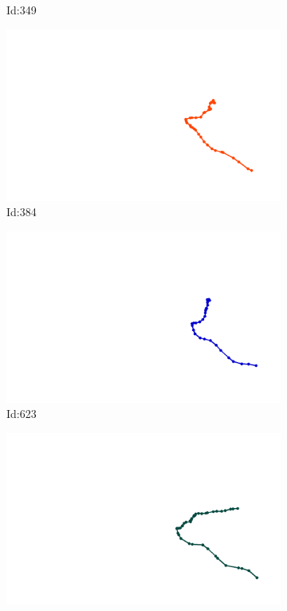 \documentclass[12pt,twoside]{report}
\begin{document}
\begin{figure}
\begin{subfigure}[b]{0.20\textwidth}
\caption{Id:349}
\end{subfigure}
\begin{subfigure}[b]{0.20\textwidth}
\centering
\includegraphics[width=\textwidth]{../../trajectories/384.png}
\caption{Id:384}
\end{subfigure}
\begin{subfigure}[b]{0.20\textwidth}
\centering
\includegraphics[width=\textwidth]{../../trajectories/623.png}
\caption{Id:623}
\end{subfigure}
\begin{subfigure}[b]{0.20\textwidth}
\centering
\includegraphics[width=\textwidth]{../../trajectories/741.png}

\end{subfigure}
\end{figure}
\end{document}
